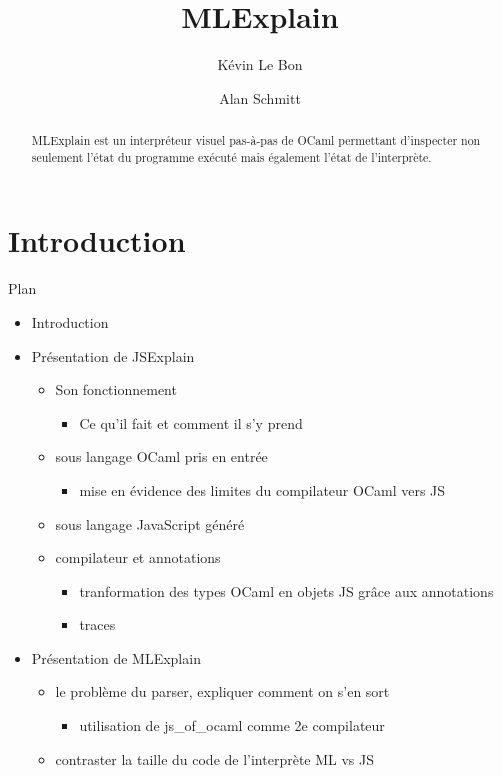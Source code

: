 \documentclass{easychair}
\title{MLExplain}
\author{
  Kévin Le Bon\inst{1}
  \and
  Alan Schmitt\inst{1}
}
\institute{
  Inria
 }
\begin{document}
\maketitle

\begin{abstract}
MLExplain est un interpréteur visuel pas-à-pas de OCaml permettant
d'inspecter non seulement l'état du programme exécuté mais également
l'état de l'interprète.
\end{abstract}

\section{Introduction}

Plan
\begin{itemize}
\item Introduction
\item Présentation de JSExplain
  \begin{itemize}
  \item Son fonctionnement
    \begin{itemize}
    \item Ce qu'il fait et comment il s'y prend
    \end{itemize}
  \item sous langage OCaml pris en entrée
    \begin{itemize}
    \item mise en évidence des limites du compilateur OCaml vers JS
    \end{itemize}
  \item sous langage JavaScript généré
  \item compilateur et annotations
    \begin{itemize}
    \item tranformation des types OCaml en objets JS grâce aux annotations
    \item traces
    \end{itemize}
  \end{itemize}
\item Présentation de MLExplain
  \begin{itemize}
  \item le problème du parser, expliquer comment on s'en sort
    \begin{itemize}
    \item utilisation de js\_of\_ocaml comme 2e compilateur
    \end{itemize}
  \item contraster la taille du code de l'interprète ML vs JS

\end{itemize}
\end{itemize}
\end{document}
